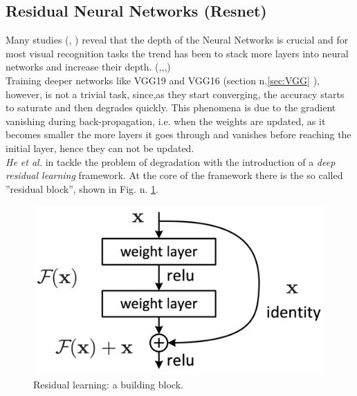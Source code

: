 \subsection[Residual Neural Networks]{Residual Neural Networks (Resnet)}
Many studies (\citep{simonyan2015deep}, \cite{szegedy2014going}) reveal that the depth of the Neural Networks is crucial and for most visual recognition tasks the trend has been to stack more layers into neural networks and increase their depth. (\cite{simonyan2015deep},\cite{ioffe2015batch},\cite{girshick2014rich},\cite{2014Spatial})\\
Training deeper networks like VGG19 and VGG16 (section n.\ref{sec:VGG} ), however, is not a trivial task, since,as they start converging, the accuracy starts to saturate and then degrades quickly. This phenomena is due to the gradient vanishing during back-propagation, i.e. when the weights are updated, as it becomes smaller the more layers it goes through and vanishes before reaching the initial layer, hence they can not be updated.  \\
\textit{He et al. } in \cite{DBLP:journals/corr/HeZRS15} tackle the problem of degradation with the introduction of a \textit{deep residual learning} framework. At the core of the framework there is the so called ''residual block'', shown in Fig. n. \ref{fig:res_block}. 
\begin{figure}[htb]
    \centering
    \includegraphics[scale = 0.3]{img/res_block.png}
    \caption[Residual learning: a building block]{Residual learning: a building block. \cite{DBLP:journals/corr/HeZRS15}}
    \label{fig:res_block}
\end{figure}

